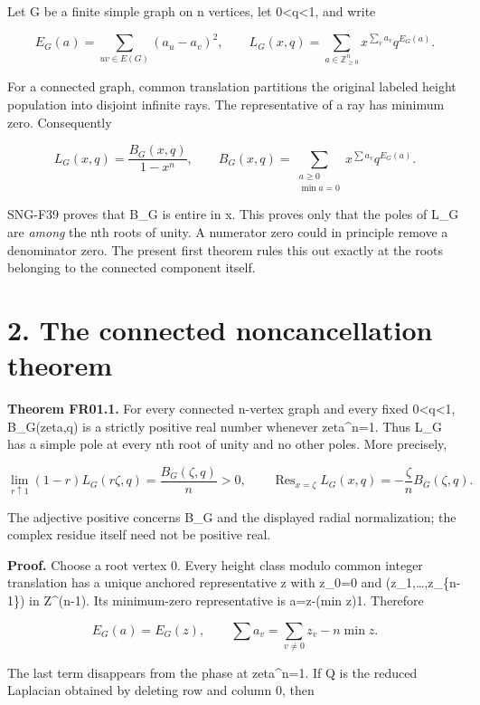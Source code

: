 \documentclass[
  11pt,
  a4paper,
]{report}
\begin{document}
Let G be a finite simple graph on n vertices, let
0\textless q\textless1, and write

\[
 E_G(a)=\sum_{uv\in E(G)}(a_u-a_v)^2,
 \qquad
 L_G(x,q)=\sum_{a\in\mathbb Z_{\ge0}^n}x^{\sum_v a_v}q^{E_G(a)}.
\]

For a connected graph, common translation partitions the original
labeled height population into disjoint infinite rays. The
representative of a ray has minimum zero. Consequently

\[
 L_G(x,q)=\frac{B_G(x,q)}{1-x^n},\qquad
 B_G(x,q)=\sum_{\substack{a\ge0\\\min a=0}}
                x^{\sum a_v}q^{E_G(a)}.
\]

SNG-F39 proves that B\_G is entire in x. This proves only that the poles
of L\_G are \emph{among} the nth roots of unity. A numerator zero could
in principle remove a denominator zero. The present first theorem rules
this out exactly at the roots belonging to the connected component
itself.

\hypertarget{the-connected-noncancellation-theorem}{%
\section{2. The connected noncancellation
theorem}\label{the-connected-noncancellation-theorem}}

\textbf{Theorem FR01.1.} For every connected n-vertex graph and every
fixed 0\textless q\textless1, B\_G(zeta,q) is a strictly positive real
number whenever zeta\^{}n=1. Thus L\_G has a simple pole at every nth
root of unity and no other poles. More precisely,

\[
 \lim_{r\uparrow1}(1-r)L_G(r\zeta,q)
       =\frac{B_G(\zeta,q)}{n}>0,
 \qquad
 \operatorname{Res}_{x=\zeta}L_G(x,q)
       =-\frac{\zeta}{n}B_G(\zeta,q).
\]

The adjective positive concerns B\_G and the displayed radial
normalization; the complex residue itself need not be positive real.

\textbf{Proof.} Choose a root vertex 0. Every height class modulo common
integer translation has a unique anchored representative z with z\_0=0
and (z\_1,\ldots,z\_\{n-1\}) in Z\^{}(n-1). Its minimum-zero
representative is a=z-(min z)1. Therefore

\[
 E_G(a)=E_G(z),\qquad
 \sum a_v=\sum_{v\ne0}z_v-n\min z.
\]

The last term disappears from the phase at zeta\^{}n=1. If Q is the
reduced Laplacian obtained by deleting row and column 0, then
\end{document}
